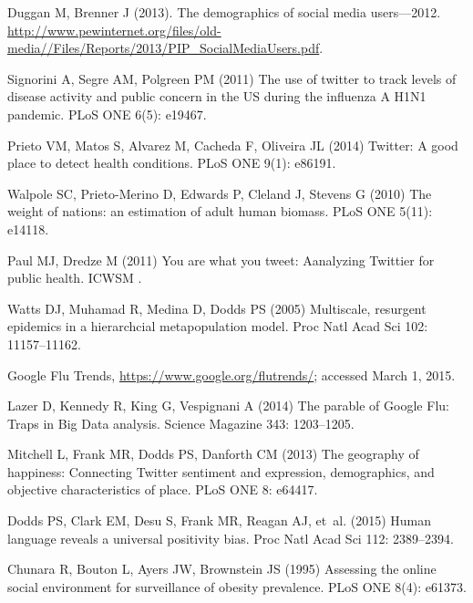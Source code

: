 \documentclass[10pt]{article}
\begin{document}
\begin{thebibliography}{10}
Duggan M, Brenner J (2013).
\newblock The demographics of social media users---2012.
\newblock
  \urlprefix\url{http://www.pewinternet.org/files/old-media//Files/Reports/2013/PIP_SocialMediaUsers.pdf}.

Signorini A, Segre AM, Polgreen PM (2011) The use of twitter to track levels of
  disease activity and public concern in the {U}{S} during the influenza {A}
  {H}1{N}1 pandemic.
\newblock PLoS ONE 6(5): e19467.

Prieto VM, Matos S, Alvarez M, Cacheda F, Oliveira JL (2014) Twitter: {A} good
  place to detect health conditions.
\newblock PLoS ONE 9(1): e86191.

Walpole SC, Prieto-Merino D, Edwards P, Cleland J, Stevens G (2010) The weight
  of nations: {a}n estimation of adult human biomass.
\newblock PLoS ONE 5(11): e14118.

Paul MJ, Dredze M (2011) You are what you tweet: {A}analyzing {T}wittier for
  public health.
\newblock ICWSM .

Watts DJ, Muhamad R, Medina D, Dodds PS (2005) Multiscale, resurgent epidemics
  in a hierarchcial metapopulation model.
\newblock Proc Natl Acad Sci 102: 11157--11162.

Google Flu Trends, \url{https://www.google.org/flutrends/}; accessed March 1,
  2015.

Lazer D, Kennedy R, King G, Vespignani A (2014) The parable of {G}oogle {F}lu:
  {T}raps in {B}ig {D}ata analysis.
\newblock Science Magazine 343: 1203--1205.

Mitchell L, Frank MR, Dodds PS, Danforth CM (2013) The geography of happiness:
  {C}onnecting {T}witter sentiment and expression, demographics, and objective
  characteristics of place.
\newblock PLoS ONE 8: e64417.

Dodds PS, Clark EM, Desu S, Frank MR, Reagan AJ, et~al. (2015) Human language
  reveals a universal positivity bias.
\newblock Proc Natl Acad Sci 112: 2389--2394.

Chunara R, Bouton L, Ayers JW, Brownstein JS (1995) Assessing the online social
  environment for surveillance of obesity prevalence.
\newblock PLoS ONE 8(4): e61373.


\end{thebibliography}
\end{document}
